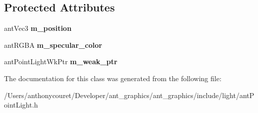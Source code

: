 \subsection*{Protected Attributes}
\begin{DoxyCompactItemize}
\item 
\hypertarget{classant_point_light_adc09bb0f8f8435e2b7075bdde86f5ab6}{ant\+Vec3 {\bfseries m\+\_\+position}}\label{classant_point_light_adc09bb0f8f8435e2b7075bdde86f5ab6}

\item 
\hypertarget{classant_point_light_abdf53de5914cc5f50a0513e071ad7232}{ant\+R\+G\+B\+A {\bfseries m\+\_\+specular\+\_\+color}}\label{classant_point_light_abdf53de5914cc5f50a0513e071ad7232}

\item 
\hypertarget{classant_point_light_a1c001f73c63d0eac6b37829c626dee9a}{ant\+Point\+Light\+Wk\+Ptr {\bfseries m\+\_\+weak\+\_\+ptr}}\label{classant_point_light_a1c001f73c63d0eac6b37829c626dee9a}

\end{DoxyCompactItemize}


The documentation for this class was generated from the following file\+:\begin{DoxyCompactItemize}
\item 
/\+Users/anthonycouret/\+Developer/ant\+\_\+graphics/ant\+\_\+graphics/include/light/ant\+Point\+Light.\+h\end{DoxyCompactItemize}
